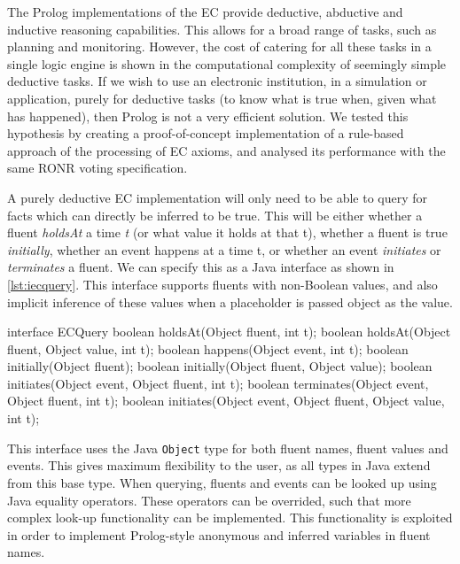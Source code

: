 The Prolog implementations of the \ac{EC} provide deductive, abductive and
inductive reasoning capabilities. This allows for a broad range of tasks, such
as planning and monitoring. However, the cost of catering for all these tasks
in a single logic engine is shown in the computational complexity of seemingly
simple deductive tasks. If we wish to use an electronic institution, in a
simulation or application, purely for deductive tasks (to know what is true
when, given what has happened), then Prolog is not a very efficient solution.
We tested this hypothesis by creating a proof-of-concept implementation of a
rule-based approach of the processing of \ac{EC} axioms, and analysed its
performance with the same \ac{RONR} voting specification.

A purely deductive \ac{EC} implementation will only need to be able to query
for facts which can directly be inferred to be true. This will be either
whether a fluent \emph{holdsAt} a time \emph{t} (or what value it holds at
that t), whether a fluent is true \emph{initially}, whether an event happens
at a time t, or whether an event \emph{initiates} or \emph{terminates} a
fluent. We can specify this as a Java interface as shown in
\autoref{lst:iecquery}. This interface supports fluents with non-Boolean
values, and also implicit inference of these values when a placeholder is passed
object as the value.

\begin{java}[label=lst:iecquery,caption=Java interface for deductive queries on an EC Specification]
interface ECQuery {
	boolean holdsAt(Object fluent, int t);
	boolean holdsAt(Object fluent, Object value, int t);
	boolean happens(Object event, int t);
	boolean initially(Object fluent);
	boolean initially(Object fluent, Object value);
	boolean initiates(Object event, Object fluent, int t);
	boolean terminates(Object event, Object fluent, int t);
	boolean initiates(Object event, Object fluent, Object value, int t);
}
\end{java}

This interface uses the Java \texttt{Object} type for both fluent names,
fluent values and events. This gives maximum flexibility to the user, as all
types in Java extend from this base type. When querying, fluents and events
can be looked up using Java equality operators. These operators can be
overrided, such that more complex look-up functionality can be implemented.
This functionality is exploited in order to implement Prolog-style anonymous
and inferred variables in fluent names.

